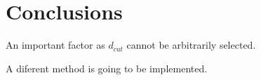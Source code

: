 \documentclass[preprint]{aastex62}
\begin{document}
\section{Conclusions}

An important factor as $d_{cut}$ cannot be arbitrarily selected. 

A diferent method is going to be implemented.

  \nocite{*}

  \begin{thebibliography}{20}


  \end{thebibliography}                                                           
                       

\end{document}
